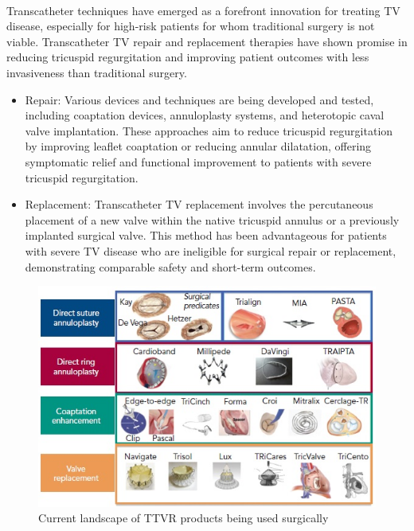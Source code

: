 \\
Transcatheter techniques have emerged as a forefront innovation for treating \gls{TV} disease, especially for high-risk patients for whom traditional surgery is not viable. Transcatheter \gls{TV} repair and replacement therapies have shown promise in reducing tricuspid regurgitation and improving patient outcomes with less invasiveness than traditional surgery.
\begin{itemize}
    \item Repair: Various devices and techniques are being developed and tested, including coaptation devices, annuloplasty systems, and heterotopic caval valve implantation. These approaches aim to reduce tricuspid regurgitation by improving leaflet coaptation or reducing annular dilatation, offering symptomatic relief and functional improvement to patients with severe tricuspid regurgitation. ~

    \item Replacement: Transcatheter \gls{TV} replacement involves the percutaneous placement of a new valve within the native tricuspid annulus or a previously implanted surgical valve. This method has been advantageous for patients with severe \gls{TV} disease who are ineligible for surgical repair or replacement, demonstrating comparable safety and short-term outcomes. ~
\end{itemize}
\begin{figure}[H]
    \centering
    \includegraphics[width=\linewidth]{figures/TTVR.jpg}
    \caption{Current landscape of \gls{TTVR} products being used surgically ~}
    \label{fig:TTVR}
\end{figure}
